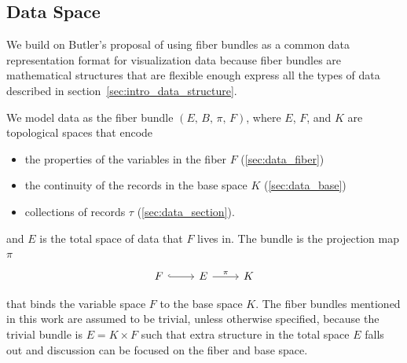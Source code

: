 \documentclass[../main.tex]{subfiles}
\begin{document}
\subsection{Data Space}
\label{sec:data}
We build on Butler's proposal of using fiber bundles as a common data representation format for visualization data\cite{butlerVectorBundleClassesForm1992, butlerVisualizationModelBased1989} because fiber bundles are mathematical structures that are flexible enough express all the types of data described in section~\ref{sec:intro_data_structure}.

We model data as the fiber bundle $(E,\,B,\,\pi ,\,F)$, where $E$, $F$, and $K$ are topological spaces that encode 
\begin{itemize}
\item the properties of the variables in the fiber $F$ (\ref{sec:data_fiber})
\item the continuity of the records in the base space $K$ (\ref{sec:data_base})
\item collections of records $\tau$ (\ref{sec:data_section}). 
\end{itemize}

and $E$ is the total space of data that $F$ lives in. The bundle is the projection map $\pi$
\begin{equation}
    \label{eq:fiber_bundle}
    \begin{tikzcd}
        F \arrow[r, hook] & E \arrow[r, "\pi"] & K
    \end{tikzcd}
\end{equation}

that binds the variable space $F$ to the base space $K$. The fiber bundles mentioned in this work are assumed to be trivial\cite{spanier1989algebraic,LocallyTrivialFibre}, unless otherwise specified, because the trivial bundle is $E=K\times F$ such that extra structure in the total space $E$ falls out and discussion can be focused on the fiber and base space. 
\end{document}
